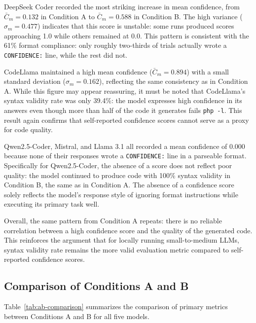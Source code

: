 DeepSeek Coder recorded the most striking increase in mean confidence, from $\bar{C}_m = 0.132$ in Condition A to $\bar{C}_m = 0.588$ in Condition B. The high variance ($\sigma_m = 0.477$) indicates that this score is unstable: some runs produced scores approaching 1.0 while others remained at 0.0. This pattern is consistent with the 61\% format compliance: only roughly two-thirds of trials actually wrote a \texttt{CONFIDENCE:} line, while the rest did not.

CodeLlama maintained a high mean confidence ($\bar{C}_m = 0.894$) with a small standard deviation ($\sigma_m = 0.162$), reflecting the same consistency as in Condition A. While this figure may appear reassuring, it must be noted that CodeLlama's syntax validity rate was only 39.4\%: the model expresses high confidence in its answers even though more than half of the code it generates fails \texttt{php -l}. This result again confirms that self-reported confidence scores cannot serve as a proxy for code quality.

Qwen2.5-Coder, Mistral, and Llama 3.1 all recorded a mean confidence of 0.000 because none of their responses wrote a \texttt{CONFIDENCE:} line in a parseable format. Specifically for Qwen2.5-Coder, the absence of a score does not reflect poor quality: the model continued to produce code with 100\% syntax validity in Condition B, the same as in Condition A. The absence of a confidence score solely reflects the model's response style of ignoring format instructions while executing its primary task well.

Overall, the same pattern from Condition A repeats: there is no reliable correlation between a high confidence score and the quality of the generated code. This reinforces the argument that for locally running small-to-medium LLMs, syntax validity rate remains the more valid evaluation metric compared to self-reported confidence scores.

\subsection{Comparison of Conditions A and B}

Table~\ref{tab:ab-comparison} summarizes the comparison of primary metrics between Conditions A and B for all five models.

